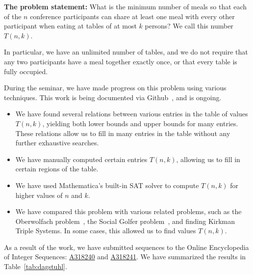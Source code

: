 \documentclass[a4paper]{article}
\begin{document}
\textbf{The problem statement:} What is the minimum number of meals so
that each of the $n$ conference participants can share at least one
meal with every other participant when eating at tables of at most $k$
persons?  We call this number $T(n,k)$.

In particular, we have an unlimited number of tables, and we do not
require that any two participants have a meal together exactly once,
or that every table is fully occupied.

\medskip

During the seminar, we have made progress on this problem using
various techniques.  This work is being documented via
Github~\cite{dagstuhl-gh}, and is ongoing.

\begin{itemize}
\item We have found several relations between various entries in the
  table of values $T(n,k)$, yielding both lower bounds and upper
  bounds for many entries. These relations allow us to fill in many
  entries in the table without any further exhaustive searches.
\item We have manually computed certain entries $T(n,k)$, allowing us
  to fill in certain regions of the table.
\item We have used Mathematica's built-in SAT solver to compute
  $T(n,k)$ for higher values of $n$ and $k$.
\item We have compared this problem with various related problems,
  such as the Oberwolfach problem~\cite{oberwolfach}, the Social
  Golfer problem~\cite{golf-mathworld,golf-oeis}, and finding Kirkman
  Triple Systems\cite{kirkman-rch}.  In some cases, this allowed us
to find values $T(n,k)$.
\end{itemize}

As a result of the work, we have submitted sequences to the Online
Encyclopedia of Integer Sequences:
\href{https://oeis.org/draft/A318240}{A318240} and
\href{https://oeis.org/draft/A318241}{A318241}.
We have summarized the results in Table~\ref{tab:dagstuhl}.
\end{document}
